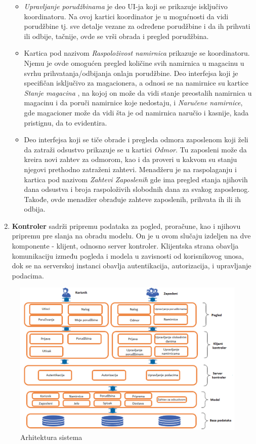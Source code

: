 \begin{enumerate}
\begin{itemize}
    \item \emph{Upravljanje porudžbinama} je deo UI-ja koji se prikazuje isključivo koordinatoru. Na ovoj kartici koordinator je u mogućnosti da vidi porudžbine tj. sve detalje vezane za određene porudžbine i da ih prihvati ili odbije, tačnije, ovde se vrši obrada i pregled porudžbina.
    
    \item Kartica pod nazivom \emph{Raspoloživost namirnica} prikazuje se koordinatoru. Njemu je ovde omogućen pregled količine svih namirnica u magacinu u svrhu prihvatanja/odbijanja onlajn porudžbine. Deo interfejsa koji je specifičan isključivo za magacionera, a odnosi se na namirnice su kartice \emph{Stanje magacina} , na kojoj on može da vidi stanje preostalih namirnica u magacinu i da poruči namirnice koje nedostaju, i \emph{Naručene namirnice}, gde magacioner može da vidi šta je od namirnica naručio i kasnije, kada pristignu, da to evidentira.
    
    
    \item Deo interfejsa koji se tiče obrade i pregleda odmora zaposlenom koji želi da zatraži odsustvo prikazuje se u kartici \emph{Odmor}. Tu zaposleni može da kreira novi zahtev za odmorom, kao i da proveri u kakvom su stanju njegovi prethodno zatraženi zahtevi.
    Menadžeru je na raspolaganju i kartica pod nazivom \emph{Zahtevi Zaposlenih} gde ima pregled stanja njihovih dana odsustva i broja raspoloživih slobodnih dana za svakog zaposlenog. Takođe, ovde menadžer obrađuje zahteve zaposlenih, prihvata ih ili ih odbija.
    \end{itemize}
    \item \textbf{Kontroler} sadrži pripremu podataka za pogled, proračune, kao i njihovu pripremu pre slanja na obradu modelu. On je u ovom slučaju izdeljen na dve komponente - klijent, odnosno server kontroler. Klijentska strana obavlja komunikaciju između pogleda i modela u zavisnosti od korisnikovog unosa, dok se na serverskoj instanci obavlja autentikacija, autorizacija, i upravljanje podacima.
\end{enumerate}

\begin{figure}[!ht]
    \leavevmode
    \centering
    \advance\leftskip-1.3cm
    \includegraphics[width=1.2\textwidth]{slike/arh1.png}
    \caption{Arhitektura sistema}
    \label{fig:slika11}
\end{figure}
\leavevmode
